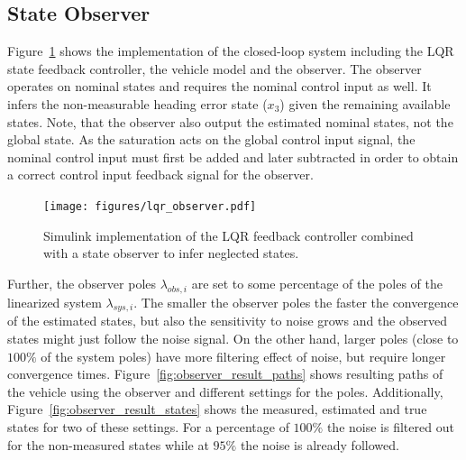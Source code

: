 \subsection{State Observer}
Figure~\ref{fig:lqr_and_observer} shows the implementation of the closed-loop system including the LQR state feedback controller, the vehicle model and the observer.
The observer operates on nominal states and requires the nominal control input as well.
It infers the non-measurable heading error state ($x_3$) given the remaining available states.
Note, that the observer also output the estimated nominal states, not the global state.
As the saturation acts on the global control input signal, the nominal control input must first be added and later subtracted in order to obtain a correct control input feedback signal for the observer.

\begin{figure}[h]
	\centering
	\texttt{[image: figures/lqr\_observer.pdf]}
	\caption{Simulink implementation of the LQR feedback controller combined with a state observer to infer neglected states.}
	\label{fig:lqr_and_observer}
\end{figure}

Further, the observer poles $\lambda_{obs,i}$ are set to some percentage of the poles of the linearized system $\lambda_{sys,i}$.
The smaller the observer poles the faster the convergence of the estimated states, but also the sensitivity to noise grows and the observed states might just follow the noise signal.
On the other hand, larger poles (close to $100\%$ of the system poles) have more filtering effect of noise, but require longer convergence times.
Figure~\ref{fig:observer_result_paths} shows resulting paths of the vehicle using the observer and different settings for the poles.
Additionally, Figure~\ref{fig:observer_result_states} shows the measured, estimated and true states for two of these settings.
For a percentage of $100\%$ the noise is filtered out for the non-measured states while at $95\%$ the noise is already followed.

